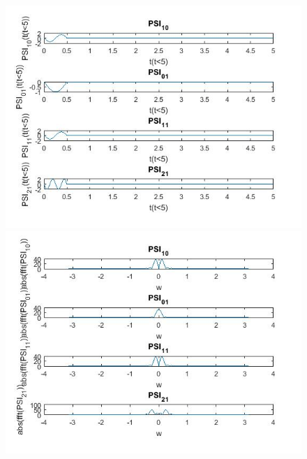 \documentclass{article}
\begin{document}
\begin{figure}[H]
\includegraphics[scale=.5]{1}
\includegraphics[scale=.5]{1_magnitude}
\end{figure}
\end{document}
